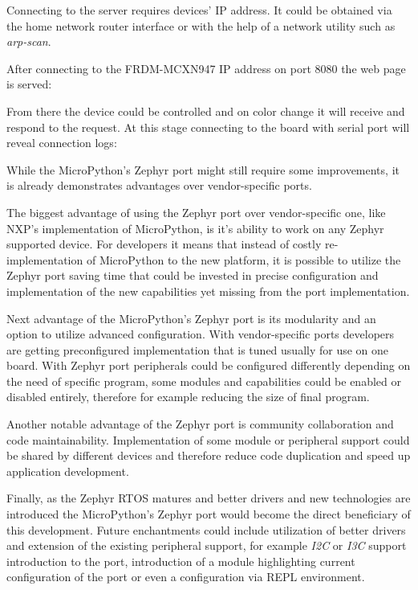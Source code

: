 \documentclass[twoside, 12pt]{article}
\begin{document}
Connecting to the server requires devices' IP address. It could be obtained via the home network router interface or with the help of a network utility such as \textit{ arp-scan}.

After connecting to the FRDM-MCXN947 IP address on port 8080 the web page is served:
\newpage
\obrazek
{}

From there the device could be controlled and on color change it will receive and respond to 
the request. At this stage connecting to the board with serial port will reveal connection logs:

\obrazek
{}

While the MicroPython's Zephyr port might still require some improvements, it is already
demonstrates advantages over vendor-specific ports.

The biggest advantage of using the Zephyr 
port over vendor-specific one, like NXP's implementation of MicroPython, is it's ability to 
work on any Zephyr supported device. For developers it means that instead of costly re-
implementation of MicroPython to the new platform, it is possible to utilize the Zephyr port
saving time that could be invested in precise configuration and implementation of the new
capabilities yet missing from the port implementation. 

Next advantage of the MicroPython's Zephyr port is its modularity and an option to utilize 
advanced configuration. With vendor-specific ports developers are getting preconfigured 
implementation that is tuned usually for use on one board. With Zephyr port peripherals could 
be configured differently depending on the need of specific program, some modules and 
capabilities could be enabled or disabled entirely, therefore for example reducing the size of 
final program.

Another notable advantage of the Zephyr port is community collaboration and code 
maintainability. Implementation of some module or peripheral support could be shared by 
different devices and therefore reduce code duplication and speed up application development.

Finally, as the Zephyr RTOS matures and better drivers and new technologies are introduced the 
MicroPython's Zephyr port would become the direct beneficiary of this development. Future 
enchantments could include utilization of better drivers and extension of the existing 
peripheral support, for example \textit{I2C} or \textit{I3C} support introduction to the port, introduction of a module highlighting current configuration of the port or even a configuration via REPL environment.
\end{document}
